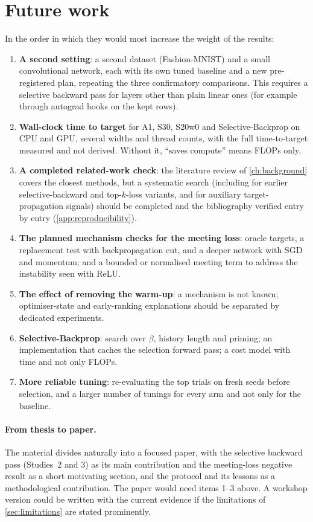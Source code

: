 \section{Future work}\label{sec:future}
In the order in which they would most increase the weight of the results:
\begin{enumerate}
\item \textbf{A second setting}: a second dataset (Fashion-MNIST) and a small convolutional network, each with its own tuned baseline and a new pre-registered plan, repeating the three confirmatory comparisons. This requires a selective backward pass for layers other than plain linear ones (for example through autograd hooks on the kept rows).
\item \textbf{Wall-clock time to target} for A1, S30, S20w0 and Selective-Backprop on CPU and GPU, several widths and thread counts, with the full time-to-target measured and not derived. Without it, ``saves compute'' means FLOPs only.
\item \textbf{A completed related-work check}: the literature review of \cref{ch:background} covers the closest methods, but a systematic search (including for earlier selective-backward and top-$k$-loss variants, and for auxiliary target-propagation signals) should be completed and the bibliography verified entry by entry (\cref{app:reproducibility}).
\item \textbf{The planned mechanism checks for the meeting loss}: oracle targets, a replacement test with backpropagation cut, and a deeper network with SGD and momentum; and a bounded or normalised meeting term to address the instability seen with ReLU.
\item \textbf{The effect of removing the warm-up}: a mechanism is not known; optimiser-state and early-ranking explanations should be separated by dedicated experiments.
\item \textbf{Selective-Backprop}: search over $\beta$, history length and priming; an implementation that caches the selection forward pass; a cost model with time and not only FLOPs.
\item \textbf{More reliable tuning}: re-evaluating the top trials on fresh seeds before selection, and a larger number of tunings for every arm and not only for the baseline.
\end{enumerate}

\paragraph{From thesis to paper.} The material divides naturally into a focused paper, with the selective backward pass (Studies~2 and 3) as its main contribution and the meeting-loss negative result as a short motivating section, and the protocol and its lessons as a methodological contribution. The paper would need items 1--3 above. A workshop version could be written with the current evidence if the limitations of \cref{sec:limitations} are stated prominently.
